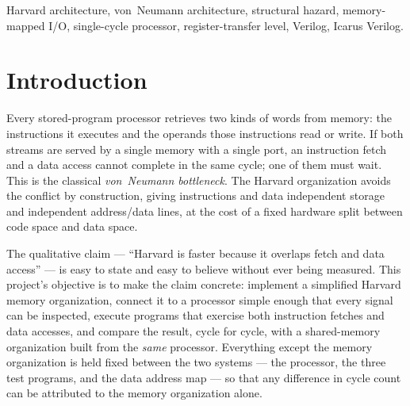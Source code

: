 \documentclass[conference]{IEEEtran}
\begin{document}
\begin{IEEEkeywords}
Harvard architecture, von~Neumann architecture, structural hazard, memory-mapped I/O, single-cycle
processor, register-transfer level, Verilog, Icarus Verilog.
\end{IEEEkeywords}

\section{Introduction}

Every stored-program processor retrieves two kinds of words from memory: the instructions it
executes and the operands those instructions read or write. If both streams are served by a single
memory with a single port, an instruction fetch and a data access cannot complete in the same
cycle; one of them must wait. This is the classical \emph{von~Neumann bottleneck}. The Harvard
organization avoids the conflict by construction, giving instructions and data independent storage
and independent address/data lines, at the cost of a fixed hardware split between code space and
data space.

The qualitative claim --- ``Harvard is faster because it overlaps fetch and data access'' --- is
easy to state and easy to believe without ever being measured. This project's objective is to make
the claim concrete: implement a simplified Harvard memory organization, connect it to a processor
simple enough that every signal can be inspected, execute programs that exercise both instruction
fetches and data accesses, and compare the result, cycle for cycle, with a shared-memory
organization built from the \emph{same} processor. Everything except the memory organization is
held fixed between the two systems --- the processor, the three test programs, and the data
address map --- so that any difference in cycle count can be attributed to the memory organization
alone.
\end{document}
